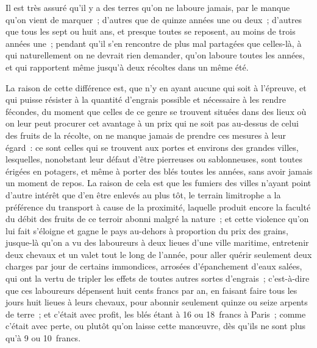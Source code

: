 \documentclass[french,twoside]{book} %
\begin{document}
Il est très assuré qu’il y a des terres qu’on ne laboure jamais, par le manque qu’on vient de marquer ; d’autres que de quinze années une ou deux ; d’autres que tous les sept ou huit ans, et presque toutes se reposent, au moins de trois années une ; pendant qu’il s’en rencontre de plus mal partagées que celles-là, à qui naturellement on ne devrait rien demander, qu’on laboure toutes les années, et qui rapportent même jusqu’à deux récoltes dans un même été.\par
La raison de cette différence est, que n’y en ayant aucune qui soit à l’épreuve, et qui puisse résister à la quantité d’engrais possible et nécessaire à les rendre fécondes, du moment que celles de ce genre se trouvent situées dans des lieux où on leur peut procurer cet avantage à un prix qui ne soit pas au-dessus de celui des fruits de la récolte, on ne manque jamais de prendre ces mesures à leur égard : ce sont celles qui se trouvent aux portes et environs des grandes villes, lesquelles, nonobstant leur défaut d’être pierreuses ou sablonneuses, sont toutes érigées en potagers, et même à porter des blés toutes les années, sans avoir jamais un moment de repos. La raison de cela est que les fumiers des villes n’ayant point d’autre intérêt que d’en être enlevés au plus tôt, le terrain limitrophe a la préférence du transport à cause de la proximité, laquelle produit encore la faculté du débit des fruits de ce terroir abonni malgré la nature ; et cette violence qu’on lui fait s’éloigne et gagne le pays au-dehors à proportion du prix des grains, jusque-là qu’on a vu des laboureurs à deux lieues d’une ville maritime, entretenir deux chevaux et un valet tout le long de l’année, pour aller quérir seulement deux charges par jour de certains immondices, arrosées d’épanchement d’eaux salées, qui ont la vertu de tripler les effets de toutes autres sortes d’engrais ; c’est-à-dire que ces laboureurs dépensent huit cents francs par an, en faisant faire tous les jours huit lieues à leurs chevaux, pour abonnir seulement quinze ou seize arpents de terre ; et c’était avec profit, les blés étant à 16 ou 18 francs à Paris ; comme c’était avec perte, ou plutôt qu’on laisse cette manœuvre, dès qu’ils ne sont plus qu’à 9 ou 10 francs.\par
\end{document}
